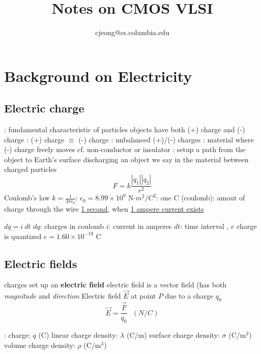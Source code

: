 \documentclass{note}
\begin{document}
\title{\large\bf Notes on CMOS VLSI}
\author{cjeong@cs.columbia.edu}
\date{}
\maketitle


\section{Background on Electricity}
\subsection{Electric charge}
\bit
\w {}: fundamental characteristic of particles
   \bit
   \w objects have both (+) charge and (-) charge
   : (+) charge $\equiv$ (-) charge
   : unbalanced (+)/(-) charges
   \eit
\w {}: material where (-) charge freely moves
   \bit
   \w cf. non-conductor or insulator
   \eit
\w {}: setup a path from the object to Earth's surface
   \bit
   \w discharging an object
   \eit
\w {}
   \bit
   \w we say  in the material
   \eit
\w {} between charged particles
    \[ F = k \frac{|q_1||q_2|}{r^2} \]
    \bit
    \w Coulomb's law
    \w $k = \frac{1}{4\pi\epsilon_0}$: 
    \w $\epsilon_0 = 8.99 \times 10^9$ N$\cdot{}m^2/C^2$:  
    \w one C (coulomb): amout of charge through the wire \underline{1 second},
    when \underline{1 ampere current exists}

    
    \eit
\w $d q = i\ dt$
    \bit
    \w $dq$: charges in coulomb
    \w $i$: current in amperes
    \w $dt$: time interval
    \eit
\w {}, $e$
    \bit
    \w charge is quantized
    \w $e = 1.60 \times 10^{-19}$ C
    \eit
\eit

\subsection{Electric fields}
\bit
\w charges set up an {\bf electric field}
\w electric field is a vector field (has both {\em magnitude\/} and {\em
  direction\/} 
\w Electric field $\vec{E}$ at point $P$ due to a charge $q_0$
   \[ \vec{E} = \frac{\vec{F}}{q_0} \ \ \ (N/C)\]

\w {}: 
   \bit
   \w charge: $q$ (C)
   \w linear charge density: $\lambda$ (C/m)
   \w surface charge density: $\sigma$ (C/m$^2$) 
   \w volume charge density: $\rho$ (C/m$^3$) 
   \eit
\eit
\end{document}
